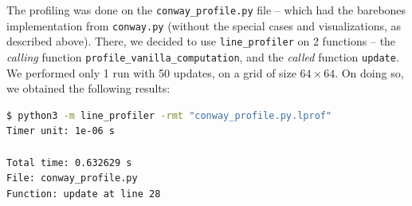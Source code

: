\documentclass[a4paper,12pt]{article}
\begin{document}
The profiling was done on the \verb|conway_profile.py| file -- which had the barebones implementation from \verb|conway.py| (without the special cases and visualizations, as described above). There, we decided to use \verb|line_profiler| on 2 functions -- the \textit{calling} function \verb|profile_vanilla_computation|, and the \textit{called} function \verb|update|. We performed only 1 run with 50 updates, on a grid of size $64 \times 64$. On doing so, we obtained the following results: 

\begin{lstlisting}[language=bash,basicstyle=\tiny\ttfamily]
$ python3 -m line_profiler -rmt "conway_profile.py.lprof"
Timer unit: 1e-06 s

Total time: 0.632629 s
File: conway_profile.py
Function: update at line 28


\end{lstlisting}
\end{document}
